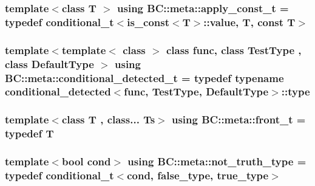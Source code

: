 \subsubsection[{\texorpdfstring{apply\+\_\+const\+\_\+t}{apply_const_t}}]{\setlength{\rightskip}{0pt plus 5cm}template$<$class T $>$ using {\bf B\+C\+::meta\+::apply\+\_\+const\+\_\+t} = typedef conditional\+\_\+t$<$is\+\_\+const$<$T$>$\+::value, T, const T$>$}\hypertarget{namespaceBC_1_1meta_a210dff319dbb0dd2a60fcfdda5779ace}{}\label{namespaceBC_1_1meta_a210dff319dbb0dd2a60fcfdda5779ace}
\subsubsection[{\texorpdfstring{conditional\+\_\+detected\+\_\+t}{conditional_detected_t}}]{\setlength{\rightskip}{0pt plus 5cm}template$<$template$<$ class $>$ class func, class Test\+Type , class Default\+Type $>$ using {\bf B\+C\+::meta\+::conditional\+\_\+detected\+\_\+t} = typedef typename {\bf conditional\+\_\+detected}$<$func, Test\+Type, Default\+Type$>$\+::type}\hypertarget{namespaceBC_1_1meta_a96ed28f49a8ffe8f0bae28da99e6ee18}{}\label{namespaceBC_1_1meta_a96ed28f49a8ffe8f0bae28da99e6ee18}
\subsubsection[{\texorpdfstring{front\+\_\+t}{front_t}}]{\setlength{\rightskip}{0pt plus 5cm}template$<$class T , class... Ts$>$ using {\bf B\+C\+::meta\+::front\+\_\+t} = typedef T}\hypertarget{namespaceBC_1_1meta_a056dc88b198c2be612e8cc5e71d5a80a}{}\label{namespaceBC_1_1meta_a056dc88b198c2be612e8cc5e71d5a80a}
\subsubsection[{\texorpdfstring{not\+\_\+truth\+\_\+type}{not_truth_type}}]{\setlength{\rightskip}{0pt plus 5cm}template$<$bool cond$>$ using {\bf B\+C\+::meta\+::not\+\_\+truth\+\_\+type} = typedef conditional\+\_\+t$<$cond, false\+\_\+type, true\+\_\+type$>$}\hypertarget{namespaceBC_1_1meta_aa86d8674ffa01ce4fdb9c908830b2279}{}\label{namespaceBC_1_1meta_aa86d8674ffa01ce4fdb9c908830b2279}
